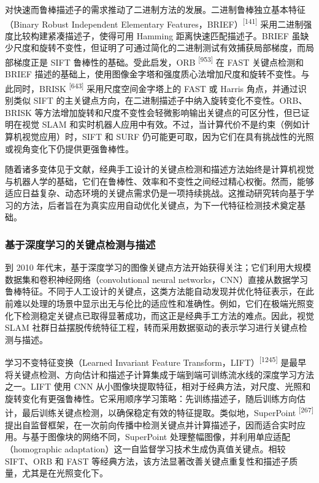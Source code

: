 对快速而鲁棒描述子的需求推动了二进制方法的发展。二进制鲁棒独立基本特征（Binary Robust Independent Elementary Features，BRIEF）\textsuperscript{[141]} 采用二进制强度比较构建紧凑描述子，使得可用 Hamming 距离快速匹配描述子。BRIEF 虽缺少尺度和旋转不变性，但证明了可通过简化的二进制测试有效捕获局部梯度，而局部梯度正是 SIFT 鲁棒性的基础。受此启发，ORB \textsuperscript{[953]} 在 FAST 关键点检测和 BRIEF 描述的基础上，使用图像金字塔和强度质心法增加尺度和旋转不变性。与此同时，BRISK \textsuperscript{[643]} 采用尺度空间金字塔上的 FAST 或 Harris 角点，并通过识别类似 SIFT 的主关键点方向，在二进制描述子中纳入旋转变化不变性。ORB、BRISK 等方法增加旋转和尺度不变性会轻微影响输出关键点的可区分性，但已证明在视觉 SLAM 和实时机器人应用中有效。不过，当计算代价不是约束（例如计算机视觉应用）时，SIFT 和 SURF 仍可能更可取，因为它们在具有挑战性的光照或视角变化下仍提供更强鲁棒性。

随着诸多变体见于文献，经典手工设计的关键点检测和描述方法始终是计算机视觉与机器人学的基础，它们在鲁棒性、效率和不变性之间经过精心权衡。然而，能够适应日益复杂、动态环境的关键点需求仍是一项持续挑战。这推动研究转向基于学习的方法，后者旨在为真实应用自动优化关键点，为下一代特征检测技术奠定基础。

\subsubsection{基于深度学习的关键点检测与描述}

到 2010 年代末，基于深度学习的图像关键点方法开始获得关注；它们利用大规模数据集和卷积神经网络（convolutional neural networks，CNN）直接从数据学习鲁棒特征。不同于人工设计的关键点，这类方法能自动发现并优化特征表示，在此前难以处理的场景中显示出无与伦比的适应性和准确性。例如，它们在极端光照变化下检测稳定关键点已取得显著成功，而这正是经典手工方法的难点。因此，视觉 SLAM 社群日益摆脱传统特征工程，转而采用数据驱动的表示学习进行关键点检测与描述。

学习不变特征变换（Learned Invariant Feature Transform，LIFT）\textsuperscript{[1245]} 是最早将关键点检测、方向估计和描述子计算集成于端到端可训练流水线的深度学习方法之一。LIFT 使用 CNN 从小图像块提取特征，相对于经典方法，对尺度、光照和旋转变化有更强鲁棒性。它采用顺序学习策略：先训练描述子，随后训练方向估计，最后训练关键点检测，以确保稳定有效的特征提取。类似地，SuperPoint \textsuperscript{[267]} 提出自监督框架，在一次前向传播中检测关键点并计算描述子，因而适合实时应用。与基于图像块的网络不同，SuperPoint 处理整幅图像，并利用单应适配（homographic adaptation）这一自监督学习技术生成伪真值关键点。相较 SIFT、ORB 和 FAST 等经典方法，该方法显著改善关键点重复性和描述子质量，尤其是在光照变化下。

